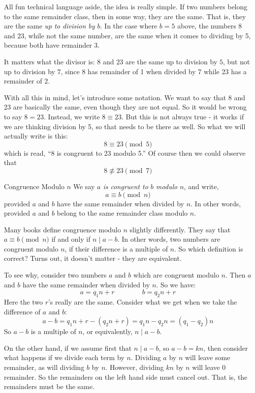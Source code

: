 \documentclass[12pt]{article}
\begin{document}
All fun technical language aside, the idea is really simple. If two numbers belong to the same remainder class, then in some way, they are the same.  That is, they are the same {\em up to division by $b$}.  In the case where $b = 5$ above, the numbers $8$ and $23$, while not the same number, are the same when it comes to dividing by 5, because both have remainder $3$.  

It matters what the divisor is: $8$ and $23$ are the same up to division by $5$, but not up to division by $7$, since $8$ has remainder of 1 when divided by 7 while 23 has a remainder of 2.  

With all this in mind, let's introduce some notation.  We want to say that $8$ and 23 are basically the same, even though they are not equal.  So it would be wrong to say $8 = 23$.  Instead, we write $8 \equiv 23$.  But this is not always true - it works if we are thinking division by 5, so that needs to be there as well.  So what we will actually write is this:
\[8 \equiv 23 \pmod{5}\]
which is read, ``8 is congruent to 23 modulo 5.''  Of course then we could observe that
\[8 \not\equiv 23 \pmod{7}\]

\begin{defbox}{Congruence Modulo $n$}
	We say {\em $a$ is  congruent to $b$ modulo $n$}, and write,
	\[a \equiv b \pmod{n}\]
	provided $a$ and $b$ have the same remainder when divided by $n$.  In other words, provided $a$ and $b$ belong to the same remainder class modulo $n$.
\end{defbox}

Many books define congruence modulo $n$ slightly differently.  They say that $a \equiv b \pmod{n}$ if and only if $n \mid a-b$.  In other words, two numbers are congruent modulo $n$, if their difference is a multiple of $n$.  So which definition is correct?  Turns out, it doesn't matter - they are equivalent.

To see why, consider two numbers $a$ and $b$ which are congruent modulo $n$.  Then $a$ and $b$ have the same remainder when divided by $n$. So we have:
\[a = q_1 n + r \qquad\qquad b = q_2 n + r\]
Here the two $r$'s really are the same.  Consider what we get when we take the difference of $a$ and $b$:
\[a-b = q_1n + r - (q_2n + r) = q_1n - q_2 n = (q_1-q_2)n\]
So $a-b$ is a multiple of $n$, or equivalently, $n \mid a-b$.

On the other hand, if we assume first that $n \mid a-b$, so $a-b = kn$, then consider what happens if we divide each term by $n$.  Dividing $a$ by $n$ will leave some remainder, as will dividing $b$ by $n$.  However, dividing $kn$ by $n$ will leave 0 remainder.  So the remainders on the left hand side must cancel out.  That is, the remainders must be the same.
\end{document}

